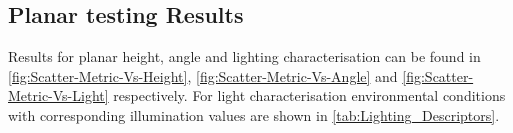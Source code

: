 
\subsection{Planar testing Results}





Results for planar height, angle and lighting characterisation can be found in \autoref{fig:Scatter-Metric-Vs-Height}, \autoref{fig:Scatter-Metric-Vs-Angle} and \autoref{fig:Scatter-Metric-Vs-Light} respectively. For light characterisation environmental conditions with corresponding illumination values are shown in \autoref{tab:Lighting_Descriptors}.


